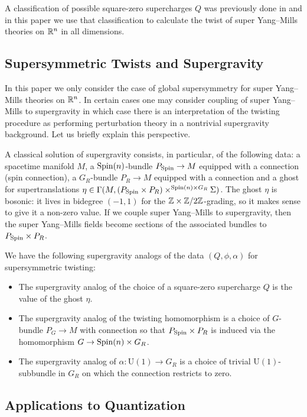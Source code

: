 \documentclass[10pt, oneside]{article}
\renewcommand{\U}{\mathrm{U}}
\begin{document}
A classification of possible square-zero supercharges $Q$ was previously done in \cite{ElliottSafronov} and in this paper we use that classification to calculate the twist of super Yang--Mills theories on $\mathbb R^n$ in all dimensions.

\subsection*{Supersymmetric Twists and Supergravity}

In this paper we only consider the case of global supersymmetry for super Yang--Mills theories on $\mathbb R^n$. In certain cases one may consider coupling of super Yang--Mills to supergravity in which case there is an interpretation of the twisting procedure as performing perturbation theory in a nontrivial supergravity background. Let us briefly explain this perspective.

A classical solution of supergravity consists, in particular, of the following data: a spacetime manifold $M$, a $\mathrm{Spin}(n)$-bundle $P_{\mathrm{Spin}}\rightarrow M$ equipped with a connection (spin connection), a $G_R$-bundle $P_R\rightarrow M$ equipped with a connection and a ghost for supertranslations $\eta\in \Gamma(M, (P_{\mathrm{Spin}}\times P_R)\times^{\mathrm{Spin}(n)\times G_R}\Sigma)$.  The ghost $\eta$ is bosonic: it lives in bidegree $(-1,1)$ for the $\mathbb Z \times \mathbb Z/2\mathbb Z$-grading, so it makes sense to give it a non-zero value.  If we couple super Yang--Mills to supergravity, then the super Yang--Mills fields become sections of the associated bundles to $P_{\mathrm{Spin}}\times P_R$.

We have the following supergravity analogs of the data $(Q, \phi, \alpha)$ for supersymmetric twisting:
\begin{itemize}
\item The supergravity analog of the choice of a square-zero supercharge $Q$ is the value of the ghost $\eta$.

\item The supergravity analog of the twisting homomorphism is a choice of $G$-bundle $P_G\rightarrow M$ with connection so that $P_{\mathrm{Spin}}\times P_R$ is induced via the homomorphism $G\rightarrow \mathrm{Spin}(n)\times G_R$.

\item The supergravity analog of $\alpha\colon \U(1)\rightarrow G_R$ is a choice of trivial $\U(1)$-subbundle in $G_R$ on which the connection restricts to zero.
\end{itemize}

\subsection*{Applications to Quantization}
\end{document}
